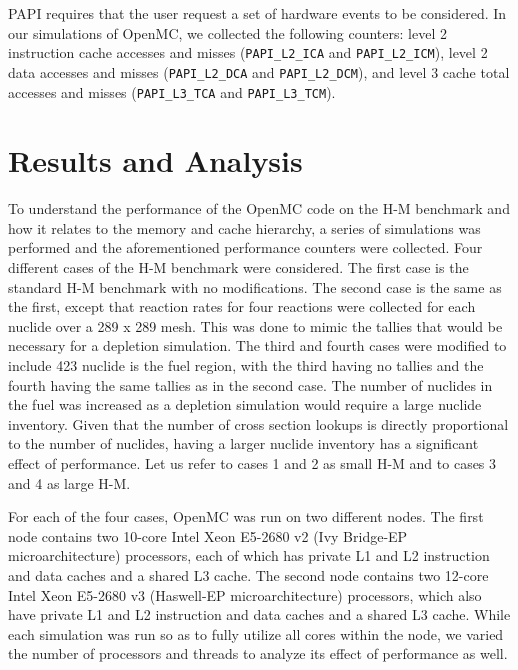 \documentclass{mc2015}
\begin{document}
PAPI requires that the user request a set of hardware events to be
considered. In our simulations of OpenMC, we collected the following counters:
level 2 instruction cache accesses and misses (\texttt{PAPI\_L2\_ICA} and
\texttt{PAPI\_L2\_ICM}), level 2 data accesses and misses
(\texttt{PAPI\_L2\_DCA} and \texttt{PAPI\_L2\_DCM}), and level 3 cache total
accesses and misses (\texttt{PAPI\_L3\_TCA} and \linebreak
\texttt{PAPI\_L3\_TCM}).

\section{Results and Analysis}

To understand the performance of the OpenMC code on the H-M benchmark and how
it relates to the memory and cache hierarchy, a series of simulations was
performed and the aforementioned performance counters were collected. Four
different cases of the H-M benchmark were considered. The first case is the
standard H-M benchmark with no modifications. The second case is the same as
the first, except that reaction rates for four reactions were collected for
each nuclide over a 289 x 289 mesh. This was done to mimic the tallies that
would be necessary for a depletion simulation. The third and fourth cases were
modified to include 423 nuclide is the fuel region, with the third having no
tallies and the fourth having the same tallies as in the second case. The
number of nuclides in the fuel was increased as a depletion simulation would
require a large nuclide inventory. Given that the number of cross section
lookups is directly proportional to the number of nuclides, having a larger
nuclide inventory has a significant effect of performance. Let us refer to
cases 1 and 2 as small H-M and to cases 3 and 4 as large H-M.

For each of the four cases, OpenMC was run on two different nodes. The first
node contains two 10-core Intel Xeon E5-2680 v2 (Ivy Bridge-EP
microarchitecture) processors, each of which has private L1 and L2 instruction
and data caches and a shared L3 cache. The second node contains two 12-core
Intel Xeon E5-2680 v3 (Haswell-EP microarchitecture) processors, which also have
private L1 and L2 instruction and data caches and a shared L3 cache. While each
simulation was run so as to fully utilize all cores within the node, we varied
the number of processors and threads to analyze its effect of performance as
well.
\end{document}
